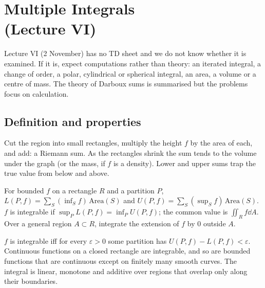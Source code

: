 \chapter[Multiple Integrals (Lecture VI)]{Multiple Integrals\\ (Lecture VI)}\label{ch:six}

\begin{examnote}
Lecture VI (2 November) has no TD sheet and we do not know whether it is examined. If it is,
expect computations rather than theory: an iterated integral, a change of order, a polar,
cylindrical or spherical integral, an area, a volume or a centre of mass. The theory of Darboux
sums is summarised but the problems focus on calculation.
\end{examnote}

\section{Definition and properties}

\begin{intuition}
Cut the region into small rectangles, multiply the height $f$ by the area of each, and add: a
Riemann sum. As the rectangles shrink the sum tends to the volume under the graph (or the mass,
if $f$ is a density). Lower and upper sums trap the true value from below and above.
\end{intuition}

\begin{defi}
For bounded $f$ on a rectangle $R$ and a partition $P$, $L(P,f)=\sum_S(\inf_Sf)\,\mathrm{Area}(S)$ and
$U(P,f)=\sum_S(\sup_Sf)\,\mathrm{Area}(S)$. $f$ is integrable if $\sup_PL(P,f)=\inf_PU(P,f)$; the
common value is $\iint_Rf\dd A$. Over a general region $A\subset R$, integrate the extension of $f$
by $0$ outside $A$.
\end{defi}

\begin{thm}
$f$ is integrable iff for every $\varepsilon>0$ some partition has $U(P,f)-L(P,f)<\varepsilon$.
Continuous functions on a closed rectangle are integrable, and so are bounded functions that
are continuous except on finitely many smooth curves. The integral is linear, monotone and
additive over regions that overlap only along their boundaries.
\end{thm}

